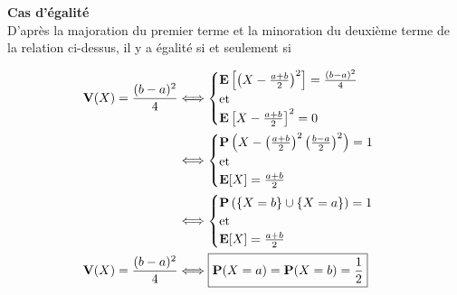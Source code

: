 \begin{solution}
    
    \textbf{Cas d'égalité}\\
    D'après la majoration du premier terme et la minoration du deuxième terme de la relation ci-dessus, il y a égalité  si et seulement si
    
    \begin{align*}
        \mathbf{V}(X) = \frac{(b-a)^2}{4} &\Longleftrightarrow
        \begin{cases}
            \mathbf{E} \left[ \left(X - \frac{a+b}{2} \right)^2 \right] = \frac{(b-a)^2}{4}\\
            \text{et}\\
            \mathbf{E} \left[X-\frac{a+b}{2} \right]^2 = 0
        \end{cases}\\
        &\Longleftrightarrow
        \begin{cases}
            \mathbf{P} \left( X - \left(\frac{a+b}{2} \right)^2  \left(\frac{b-a}{2} \right)^2 \right)= 1\\
            \text{et}\\
            \mathbf{E} [X] = \frac{a+b}{2}
        \end{cases}\\
        &\Longleftrightarrow
        \begin{cases}
            \mathbf{P} \left( \{ X=b \} \cup \{X=a\} \right)= 1\\
            \text{et}\\
            \mathbf{E} [X] = \frac{a+b}{2}
        \end{cases}\\
        \mathbf{V}(X) = \frac{(b-a)^2}{4} &\Longleftrightarrow \boxed{\mathbf{P}(X=a)=\mathbf{P}(X=b)=\frac{1}{2}}
    \end{align*}
\end{solution}

